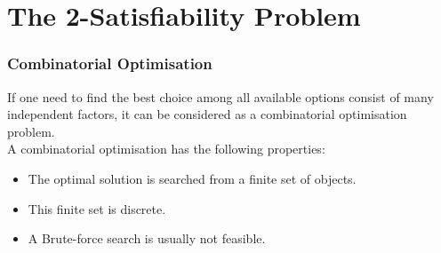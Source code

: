 \documentclass{beamer}
\begin{document}

\section{The 2-Satisfiability Problem}
\begin{frame}
	\frametitle{Combinatorial Optimisation}
	If one need to find the best choice among all available options consist of many independent factors, it can be considered
	as a combinatorial optimisation problem.\\
	A combinatorial optimisation has the following properties:\\
	\begin{itemize}
		\item The optimal solution is searched from a finite set of objects.
		\item This finite set is discrete.
		\item A Brute-force search is usually not feasible.
	\end{itemize}
		
\end{frame}
\end{document}

